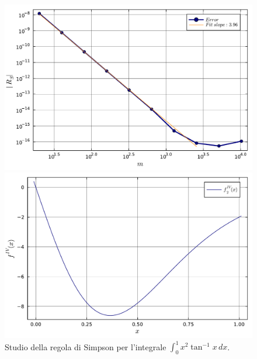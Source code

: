 \documentclass[letterpaper, 12pt]{article}
\begin{document}
\begin{figure}[!ht]
    \centering
    \begin{minipage}[b]{0.47\textwidth}
        \includegraphics[width=\textwidth]{5142.pdf}
    \end{minipage}
    \hspace{0.5cm}
    \begin{minipage}[b]{0.47\textwidth}
        \includegraphics[width=\textwidth]{5142_2.pdf}
    \end{minipage}
    \caption{Studio della regola di Simpson per l'integrale $\int_0^1 x^2 \tan^{-1}x\, dx$.}
    \label{fig:es5_1_4_2}
\end{figure}
\end{document}
